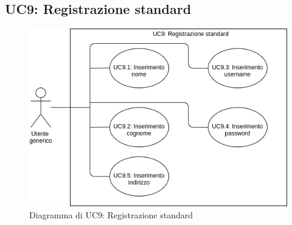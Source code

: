 \newpage
\subsection{UC9: Registrazione standard}
\label{sec:UC9}
\begin{figure}[!ht]
    \caption{Diagramma di UC9: Registrazione standard}
    \vspace{10px}
    \includegraphics[scale=0.5]{../../../Images/AnalisiRequisiti/UC09.png}
    \centering
\end{figure}
